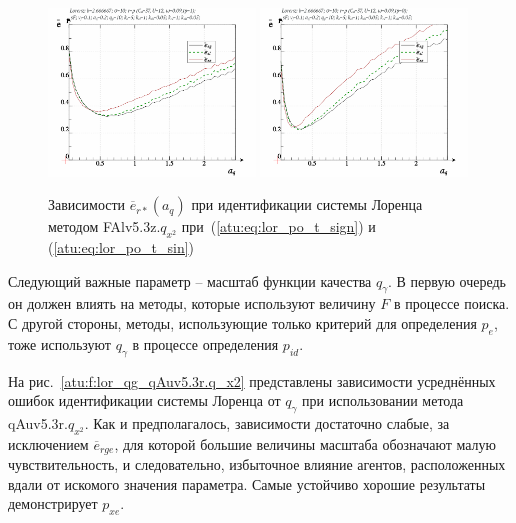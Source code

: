 \begin{figure}[h!]
  \centerline{
    \includegraphics[width=0.49\textwidth]{p/cha/lor/FAlv5.3z/lor_FAlv5_3z_qx2-p_a_q_e_sign.png}
    \hfill
    \includegraphics[width=0.49\textwidth]{p/cha/lor/FAlv5.3z/lor_FAlv5_3z_qx2-p_a_q_e_sin.png}
  }
  \caption{Зависимости $\overline{e}_{r*}(a_q)$ при идентификации системы Лоренца методом FAlv5.3z.$q_{x^2}$
   при~(\ref{atu:eq:lor_po_t_sign}) и (\ref{atu:eq:lor_po_t_sin})}
  \label{atu:f:lor_a_q_FAlv5.3z.q_x2}
\end{figure}


Следующий важные параметр -- масштаб функции качества $q_\gamma$.
В первую очередь он должен влиять на методы,
которые используют величину $F$ в процессе поиска.
С другой стороны, методы, использующие только критерий для
определения $p_e$, тоже используют  $q_\gamma$ в процессе
определения $p_{id}$.

На рис.~\ref{atu:f:lor_qg_qAuv5.3r.q_x2} представлены зависимости
усреднённых ошибок идентификации системы Лоренца от $q_\gamma$ при использовании метода qAuv5.3r.$q_{x^2}$.
Как и предполагалось, зависимости достаточно слабые, за исключением $\overline{e}_{rge}$,
для которой большие величины масштаба обозначают малую чувствительность,
и следовательно, избыточное влияние агентов, расположенных
вдали от искомого значения параметра.
Самые устойчиво хорошие результаты демонстрирует $p_{xe}$.

